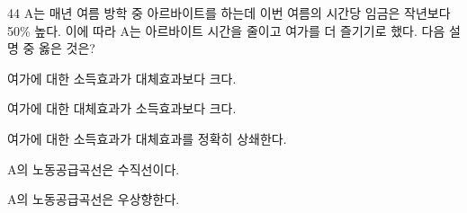 \begin{question}{44}
A는 매년 여름 방학 중 아르바이트를 하는데 이번 여름의 시간당 임금은 작년보다 50\% 높다. 이에 따라 A는 아르바이트 시간을 줄이고 여가를 더 즐기기로 했다. 다음 설명 중 옳은 것은?
\begin{choices}
  \item 여가에 대한 소득효과가 대체효과보다 크다.
  \item 여가에 대한 대체효과가 소득효과보다 크다.
  \item 여가에 대한 소득효과가 대체효과를 정확히 상쇄한다.
  \item A의 노동공급곡선은 수직선이다.
  \item A의 노동공급곡선은 우상향한다.
\end{choices}
\end{question}
